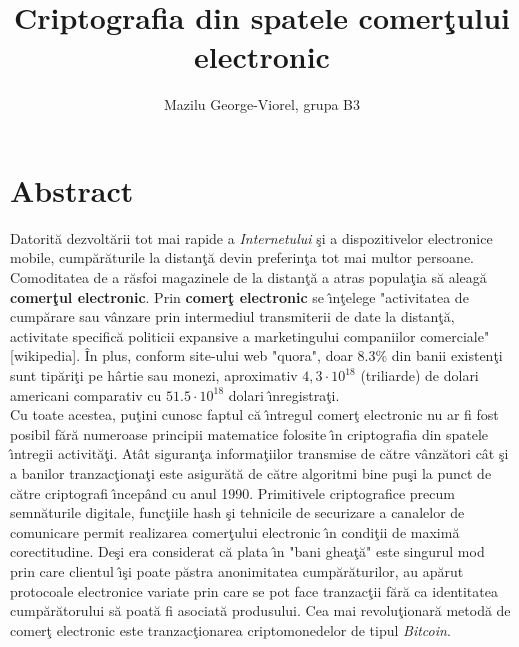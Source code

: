 \documentclass[]{scrartcl}
\title{Criptografia din spatele comer\c{t}ului electronic}
\author{Mazilu George-Viorel, grupa B3}
\date{}
\newcommand\tab[1][0.7cm]{\hspace*{#1}}
\begin{document}
\maketitle

\begin{abstract}

\end{abstract}

\section*{Abstract}
\tab	Datorit\u{a} dezvolt\u{a}rii tot mai rapide a \textit{Internetului} \c{s}i a dispozitivelor electronice mobile, cump\u{a}r\u{a}turile la distan\c{t}\u{a} devin preferin\c{t}a tot mai multor persoane. Comoditatea de a r\u{a}sfoi magazinele de la distan\c{t}\u{a} a atras popula\c{t}ia s\u{a} aleag\u{a} \textbf{comer\c{t}ul electronic}. Prin \textbf{comer\c{t} electronic} se \^{\i}n\c{t}elege "activitatea de cump\u{a}rare sau v\^{a}nzare prin intermediul transmiterii de date la distan\c{t}\u{a}, activitate specific\u{a} politicii expansive a marketingului companiilor comerciale" [wikipedia]. \^{I}n plus, conform site-ului web "quora", doar 8.3\% din banii existen\c{t}i sunt tip\u{a}ri\c{t}i pe h\^{a}rtie sau monezi, aproximativ $4,3 \cdot 10^{18} $ (triliarde) de dolari americani comparativ cu $51.5 \cdot 10^{18} $ dolari \^{\i}nregistra\c{t}i. \\
\tab Cu toate acestea, pu\c{t}ini cunosc faptul c\u{a} \^{\i}ntregul comer\c{t} electronic nu ar fi fost posibil f\u{a}r\u{a} numeroase principii matematice folosite \^{\i}n criptografia din spatele \^{\i}ntregii activit\u{a}\c{t}i. At\^{a}t siguran\c{t}a informa\c{t}iilor transmise de c\u{a}tre v\^{a}nz\u{a}tori c\^{a}t \c{s}i a banilor tranzac\c{t}iona\c{t}i este asigur\u{a}t\u{a} de c\u{a}tre algoritmi bine pu\c{s}i la punct de c\u{a}tre criptografi \^{\i}ncep\^{a}nd cu anul 1990. Primitivele criptografice precum semn\u{a}turile digitale, func\c{t}iile hash \c{s}i tehnicile de securizare a canalelor de comunicare permit realizarea comer\c{t}ului electronic \^{\i}n condi\c{t}ii de maxim\u{a} corectitudine. De\c{s}i era considerat c\u{a} plata \^{\i}n "bani ghea\c{t}\u{a}" este singurul mod prin care clientul \^{\i}\c{s}i poate p\u{a}stra anonimitatea cump\u{a}r\u{a}turilor, au ap\u{a}rut protocoale electronice variate prin care se pot face tranzac\c{t}ii f\u{a}r\u{a} ca identitatea cump\u{a}r\u{a}torului s\u{a} poat\u{a} fi asociat\u{a} produsului. Cea mai revolu\c{t}ionar\u{a} metod\u{a} de comer\c{t} electronic este tranzac\c{t}ionarea criptomonedelor de tipul \textit{Bitcoin}.  \\
\end{document}
